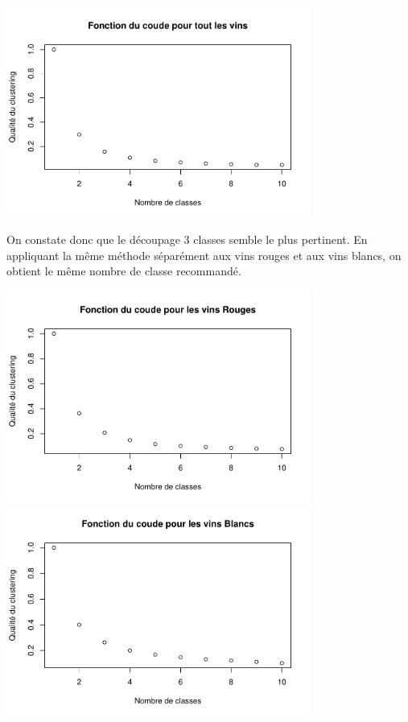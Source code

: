 \documentclass[
]{article}
\begin{document}
\begin{center}
	\includegraphics[width=10cm]{repport_files/figure-latex/unnamed-chunk-5-1.pdf}
\end{center}

On constate donc que le découpage 3 classes semble le plus pertinent. En
appliquant la même méthode séparément aux vins rouges et aux vins
blancs, on obtient le même nombre de classe recommandé.

\begin{center}
	\includegraphics[width=10cm]{repport_files/figure-latex/unnamed-chunk-6-1.pdf}
\includegraphics[width=10cm]{repport_files/figure-latex/unnamed-chunk-6-2.pdf}
\end{center}
\end{document}

